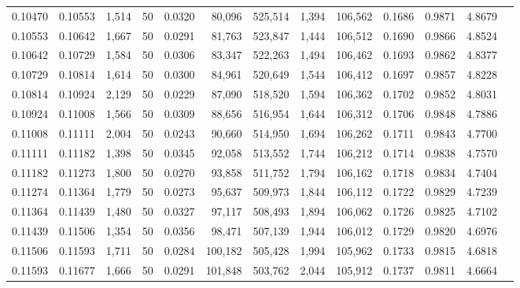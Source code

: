 \begin{tabular}{rrrrrrrrrrrrr}
0.10470 & 0.10553 & 1,514 &  50 &                                     0.0320 &  80,096 & 525,514 &   1,394 & 106,562 & 0.1686 & 0.9871 & 4.8679 \\
0.10553 & 0.10642 & 1,667 &  50 &                                     0.0291 &  81,763 & 523,847 &   1,444 & 106,512 & 0.1690 & 0.9866 & 4.8524 \\
0.10642 & 0.10729 & 1,584 &  50 &                                     0.0306 &  83,347 & 522,263 &   1,494 & 106,462 & 0.1693 & 0.9862 & 4.8377 \\
0.10729 & 0.10814 & 1,614 &  50 &                                     0.0300 &  84,961 & 520,649 &   1,544 & 106,412 & 0.1697 & 0.9857 & 4.8228 \\
0.10814 & 0.10924 & 2,129 &  50 &                                     0.0229 &  87,090 & 518,520 &   1,594 & 106,362 & 0.1702 & 0.9852 & 4.8031 \\
0.10924 & 0.11008 & 1,566 &  50 &                                     0.0309 &  88,656 & 516,954 &   1,644 & 106,312 & 0.1706 & 0.9848 & 4.7886 \\
0.11008 & 0.11111 & 2,004 &  50 &                                     0.0243 &  90,660 & 514,950 &   1,694 & 106,262 & 0.1711 & 0.9843 & 4.7700 \\
0.11111 & 0.11182 & 1,398 &  50 &                                     0.0345 &  92,058 & 513,552 &   1,744 & 106,212 & 0.1714 & 0.9838 & 4.7570 \\
0.11182 & 0.11273 & 1,800 &  50 &                                     0.0270 &  93,858 & 511,752 &   1,794 & 106,162 & 0.1718 & 0.9834 & 4.7404 \\
0.11274 & 0.11364 & 1,779 &  50 &                                     0.0273 &  95,637 & 509,973 &   1,844 & 106,112 & 0.1722 & 0.9829 & 4.7239 \\
0.11364 & 0.11439 & 1,480 &  50 &                                     0.0327 &  97,117 & 508,493 &   1,894 & 106,062 & 0.1726 & 0.9825 & 4.7102 \\
0.11439 & 0.11506 & 1,354 &  50 &                                     0.0356 &  98,471 & 507,139 &   1,944 & 106,012 & 0.1729 & 0.9820 & 4.6976 \\
0.11506 & 0.11593 & 1,711 &  50 &                                     0.0284 & 100,182 & 505,428 &   1,994 & 105,962 & 0.1733 & 0.9815 & 4.6818 \\
0.11593 & 0.11677 & 1,666 &  50 &                                     0.0291 & 101,848 & 503,762 &   2,044 & 105,912 & 0.1737 & 0.9811 & 4.6664 \\

\end{tabular}
